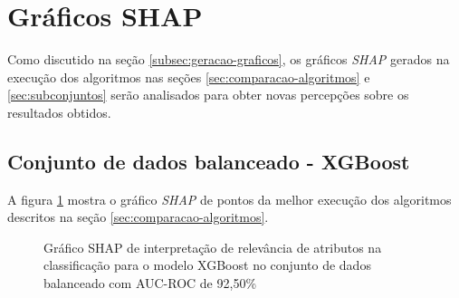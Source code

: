 \section{Gráficos SHAP}
\label{sec:resultados-extras}

Como discutido na seção \ref{subsec:geracao-graficos}, os gráficos \textit{SHAP} gerados na execução dos algoritmos nas seções \ref{sec:comparacao-algoritmos} e \ref{sec:subconjuntos} serão analisados para obter novas percepções sobre os resultados obtidos.

\subsection{Conjunto de dados balanceado - XGBoost}
\label{subsec:xgboost-balanceado}

A figura \ref{fig:xgboost-balanceado} mostra o gráfico \textit{SHAP} de pontos da melhor execução dos algoritmos descritos na seção \ref{sec:comparacao-algoritmos}.

\begin{figure}[ht!]
  \centering
  \caption{\textmd{Gráfico SHAP de interpretação de relevância de atributos na classificação para o modelo XGBoost no conjunto de dados balanceado com AUC-ROC de 92,50\%}}
  \label{fig:xgboost-balanceado}
\end{figure}


